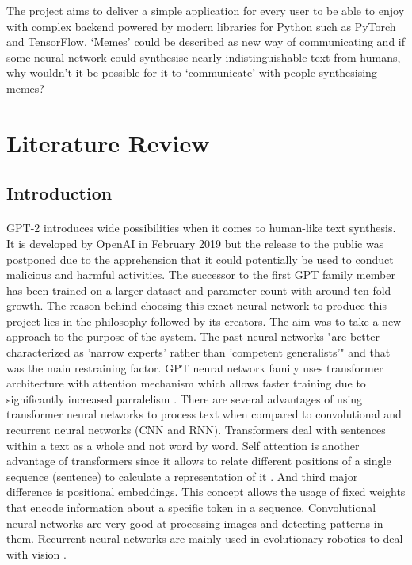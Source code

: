 \documentclass[12pt]{report}
\begin{document}
    The project aims to deliver a simple application for every user to be able to enjoy with complex backend powered by modern libraries for Python such as PyTorch and TensorFlow. 
    `Memes' could be described as new way of communicating and if some neural network could synthesise nearly indistinguishable text from humans, why wouldn't it be possible for it to `communicate' with people synthesising memes?

    
    \section*{Literature Review}

    \subsection*{Introduction}
    \paragraph{}
    

    GPT-2 introduces wide possibilities when it comes to human-like text synthesis. It is developed by OpenAI in February 2019 but the
    release to the public was postponed due to the apprehension that it could potentially be used to conduct malicious and harmful activities. The successor to
    the first GPT family member has been trained on a larger dataset and parameter count with around ten-fold growth. The reason behind
    choosing this exact neural network to produce this project lies in the philosophy followed by its creators. The aim was to take a new approach to the purpose of the system.
    The past neural networks "are better characterized as 'narrow experts' rather than  'competent generalists'" \citep{radford_wu_child_luan_amodei_sutskever_2019} and that was
    the main restraining factor. GPT neural network family uses transformer architecture with attention mechanism which allows faster training due to significantly increased parralelism \citep{attention_is_all_you_need}.
    There are several advantages of using transformer neural networks to process text when compared to convolutional and recurrent neural networks (CNN and RNN). Transformers deal with sentences within a text as a whole and not word by word.
    Self attention is another advantage of transformers since it allows to relate different positions of a single sequence (sentence) to calculate a representation of it \citep{attention_is_all_you_need}.
    And third major difference is positional embeddings. This concept allows the usage of fixed weights that encode information about a specific token in a sequence.
    Convolutional neural networks are very good at processing images and detecting patterns in them. Recurrent neural networks are mainly used in evolutionary robotics to deal with vision \citep{inproceedings}.
    
\end{document}
